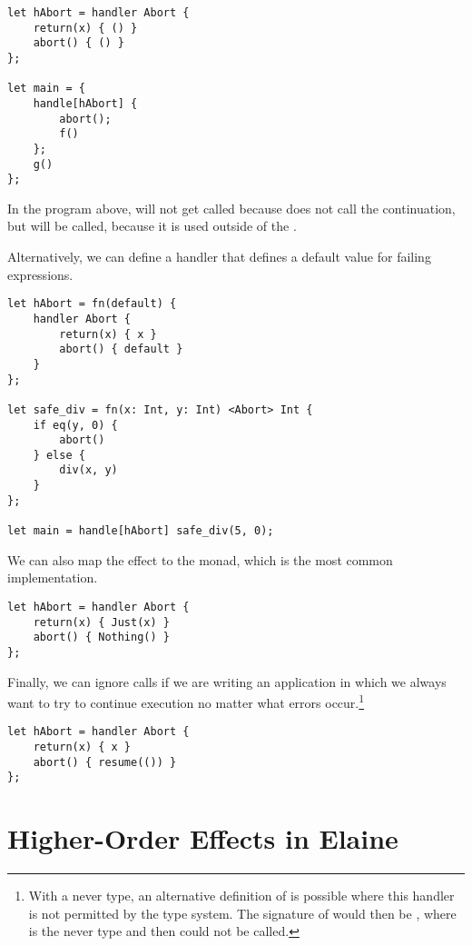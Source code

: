 \begin{lstlisting}[language=elaine, style=fancy]
let hAbort = handler Abort {
    return(x) { () }
    abort() { () }
};

let main = {
    handle[hAbort] {
        abort();
        f()
    };
    g()
};
\end{lstlisting}

In the program above,  will not get called because  does not call the continuation, but  will be called, because it is used outside of the .

Alternatively, we can define a handler that defines a default value for failing expressions.

\begin{lstlisting}[language=elaine, style=fancy]
let hAbort = fn(default) {
    handler Abort {
        return(x) { x }
        abort() { default }
    }
};

let safe_div = fn(x: Int, y: Int) <Abort> Int {
    if eq(y, 0) {
        abort()
    } else {
        div(x, y)
    }
};

let main = handle[hAbort] safe_div(5, 0);
\end{lstlisting}

We can also map the  effect to the  monad, which is the most common implementation.

\begin{lstlisting}[language=elaine, style=fancy]
let hAbort = handler Abort {
    return(x) { Just(x) }
    abort() { Nothing() }
};
\end{lstlisting}

Finally, we can ignore  calls if we are writing an application in which we always want to try to continue execution no matter what errors occur.\footnote{With a never type, an alternative definition of  is possible where this handler is not permitted by the type system. The signature of  would then be , where \el{!} is the never type and then  could not be called.}

\begin{lstlisting}[language=elaine, style=fancy]
let hAbort = handler Abort {
    return(x) { x }
    abort() { resume(()) }
};
\end{lstlisting}

\section{Higher-Order Effects in Elaine}

